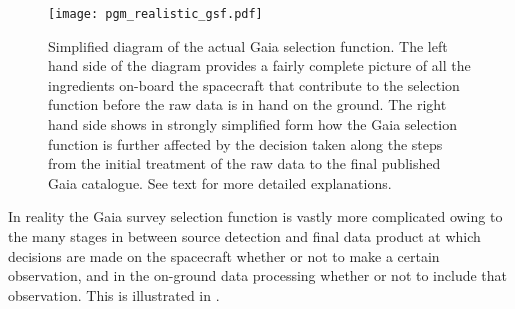 \begin{figure}[t]
    \centering
    \texttt{[image: pgm\_realistic\_gsf.pdf]}
    \caption{Simplified diagram of the actual Gaia selection function. The left hand side of the diagram provides a fairly complete picture of all the ingredients on-board the spacecraft that contribute to the selection function before the raw data is in hand on the ground. The right hand side shows in strongly simplified form how the Gaia selection function is further affected by the decision taken along the steps from the initial treatment of the raw data to the final published Gaia catalogue. See text for more detailed explanations.}
    \label{fig:gsf_realistic}
\end{figure}

In reality the Gaia survey selection function is vastly more complicated owing to the many stages in between source detection and final data product at which decisions are made on the spacecraft whether or not to make a certain observation, and in the on-ground data processing whether or not to include that observation. This is illustrated in .
